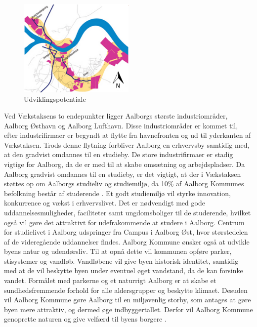 \begin{figure}[htbp]
	\centering
	\includegraphics[width=0.5\textwidth]{billeder/udvikling.png}
	\caption{Udviklingspotentiale}
	\label{fig:udvikling}
\end{figure}

Ved Vækstaksens to endepunkter ligger Aalborgs største industriområder, Aalborg Østhavn og Aalborg Lufthavn. Disse industriområder er kommet til, efter industrifirmaer er begyndt at flytte fra havnefronten og ud til yderkanten af Vækstaksen. Trods denne flytning forbliver Aalborg en erhvervsby samtidig med, at den gradvist omdannes til en studieby. De store industrifirmaer er stadig vigtige for Aalborg, da de er med til at skabe omsætning og arbejdspladser. 
\newline \indent{     }  Da Aalborg gradvist omdannes til en studieby, er det vigtigt, at der i Vækstaksen støttes op om Aalborgs studieliv og studiemiljø, da 10\% af Aalborg Kommunes befolkning består af studerende \citep{campus}. Et godt studiemiljø vil styrke innovation, konkurrence og vækst i erhvervslivet. Det er nødvendigt med gode uddannelsesmuligheder, faciliteter samt ungdomsboliger til de studerende, hvilket også vil gøre det attraktivt for udefrakommende at studere i Aalborg. Centrum for studielivet i Aalborg udspringer fra Campus i Aalborg Øst, hvor størstedelen af de videregående uddannelser findes. 
\newline
\newline
Aalborg Kommune ønsker også at udvikle byens natur og udendørsliv. Til at opnå dette vil kommunen opføre parker, stisystemer og vandløb. Vandløbene vil give byen historisk identitet, samtidig med at de vil beskytte byen under eventuel øget vandstand, da de kan forsinke vandet. Formålet med parkerne og et naturrigt Aalborg er at skabe et sundhedsfremmende forhold for alle aldersgrupper og beskytte klimaet. Desuden vil Aalborg Kommune gøre Aalborg til en miljøvenlig storby, som antages at gøre byen mere attraktiv, og dermed øge indbyggertallet. Derfor vil Aalborg Kommune genoprette naturen og give velfærd til byens borgere \citep{kommuneplan3}.

